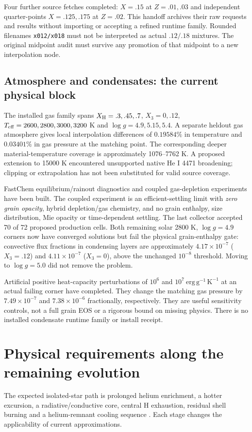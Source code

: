 \documentclass[11pt,letterpaper]{article}
\begin{document}
Four further source fetches completed: $X=.15$ at $Z=.01,.03$ and independent
quarter-points $X=.125,.175$ at $Z=.02$. This handoff archives their raw requests
and results without importing or accepting a refined runtime family. Rounded
filenames \texttt{x012/x018} must not be interpreted as actual $.12/.18$ mixtures.
The original midpoint audit must survive any promotion of that midpoint to a
new interpolation node.

\subsection{Atmosphere and condensates: the current physical block}
The installed gas family spans $X_{\rm H}=.3,.45,.7$, $X_3=0,.12$,
$T_{\rm eff}=2600,2800,3000,3200$ K and $\log g=4.9,5.15,5.4$.
A separate heldout gas atmosphere gives local interpolation differences of
$0.19584\%$ in temperature and $0.03401\%$ in gas pressure at the matching point.
The corresponding deeper material-temperature coverage is approximately
1076--7762 K. A proposed extension to 15000 K encountered unsupported native
He I 4471 broadening; clipping or extrapolation has not been substituted for
valid source coverage.

FastChem equilibrium/rainout diagnostics and coupled gas-depletion experiments
have been built. The coupled experiment is an efficient-settling limit with
\emph{zero grain opacity}, hybrid depletion/gas chemistry, and no grain
enthalpy, size distribution, Mie opacity or time-dependent settling.
The last collector accepted 70 of 72 proposed production cells. Both remaining
solar 2800 K, $\log g=4.9$ corners now have converged solutions but fail the
physical grain-enthalpy gate: convective flux fractions in condensing layers are
approximately $4.17\times10^{-7}$ ($X_3=.12$) and $4.11\times10^{-7}$ ($X_3=0$),
above the unchanged $10^{-8}$ threshold. Moving to $\log g=5.0$ did not remove
the problem.

Artificial positive heat-capacity perturbations of $10^6$ and
$10^7\ \mathrm{erg\,g^{-1}\,K^{-1}}$ at an actual failing corner have completed.
They change the matching gas pressure by $7.49\times10^{-7}$ and
$7.38\times10^{-6}$ fractionally, respectively. They are useful sensitivity
controls, not a full grain EOS or a rigorous bound on missing physics.
There is no installed condensate runtime family or install receipt.

\section{Physical requirements along the remaining evolution}
The expected isolated-star path is prolonged helium enrichment, a hotter
excursion, a radiative/conductive core, central H exhaustion, residual shell
burning and a helium-remnant cooling sequence \cite{lba97,adams97}.
Each stage changes the applicability of current approximations.
\end{document}
